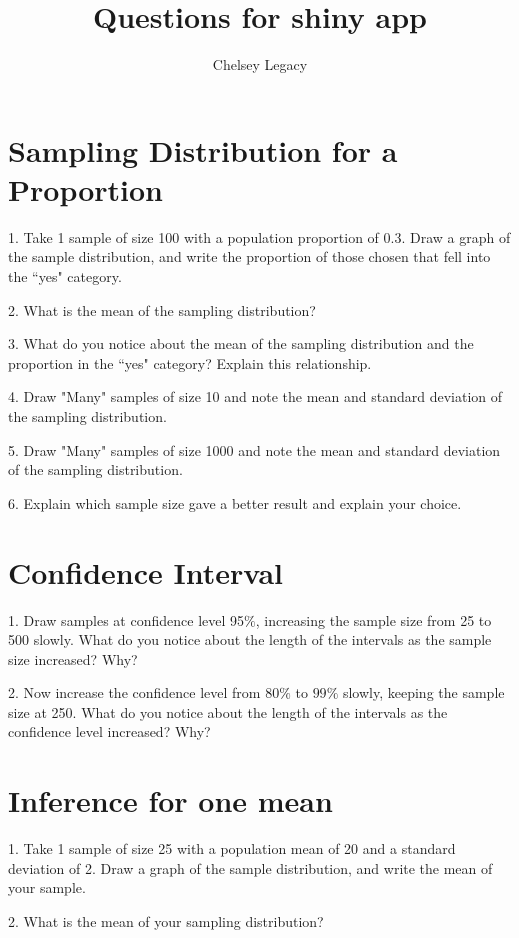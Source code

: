 \documentclass[11pt]{amsart}
\title{Questions for shiny app}
\author{Chelsey Legacy}
\begin{document}
\maketitle
\section{Sampling Distribution for a Proportion}
1.  Take 1 sample of size 100 with a population proportion of 0.3. Draw a graph of the sample distribution, and write the proportion of those chosen that fell into the ``yes" category. 

2. What is the mean of the sampling distribution?

3. What do you notice about the mean of the sampling distribution and the proportion in the ``yes" category? Explain this relationship.

4. Draw "Many" samples of size 10 and note the mean and standard deviation of the sampling distribution.

5. Draw "Many" samples of size 1000 and note the mean and standard deviation of the sampling distribution.

6. Explain which sample size gave a better result and explain your choice.



\section{Confidence Interval}

1. Draw samples at confidence level 95$\%$, increasing the sample size from 25 to 500 slowly. What do you notice about the length of the intervals as the sample size increased? Why?



2. Now increase the confidence level from $80\%$ to $99\%$ slowly, keeping the sample size at 250. What do you notice about the length of the intervals as the confidence level increased? Why?




\section{Inference for one mean}

1.  Take 1 sample of size 25 with a population mean of 20 and a standard deviation of 2. Draw a graph of the sample distribution, and write the mean of your sample.

2. What is the mean of your sampling distribution?
\end{document}
